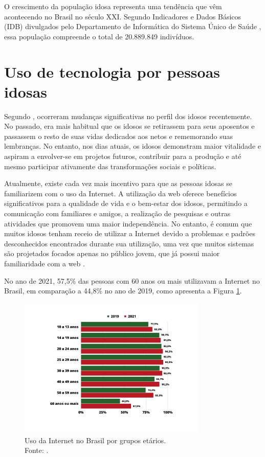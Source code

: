 O crescimento da população idosa representa uma tendência que vêm acontecendo no Brasil no século XXI. Segundo Indicadores e Dados Básicos (IDB) divulgados pelo Departamento de Informática do Sistema Único de Saúde \cite{DATASUS2012}, essa população compreende o total de 20.889.849 indivíduos.

\section{Uso de tecnologia por pessoas idosas}

Segundo , ocorreram mudanças significativas no perfil dos idosos recentemente. No passado, era mais habitual que os idosos se retirassem para seus aposentos e passassem o resto de suas vidas dedicados aos netos e rememorando suas lembranças. No entanto, nos dias atuais, os idosos demonstram maior vitalidade e aspiram a envolver-se em projetos futuros, contribuir para a produção e até mesmo participar ativamente das transformações sociais e políticas. 

Atualmente, existe cada vez mais incentivo para que as pessoas idosas se familiarizem com o uso da Internet. A utilização da web oferece benefícios significativos para a qualidade de vida e o bem-estar dos idosos, permitindo a comunicação com familiares e amigos, a realização de pesquisas e outras atividades que promovem uma maior independência. No entanto, é comum que muitos idosos tenham receio de utilizar a Internet devido a problemas e padrões desconhecidos encontrados durante sua utilização, uma vez que muitos sistemas são projetados focados apenas no público jovem, que já possui maior familiaridade com a web \cite{rodrigues2018support}.

No ano de 2021, 57,5\% das pessoas com 60 anos ou mais utilizavam a Internet no Brasil, em comparação a 44,8\% no ano de 2019, como apresenta a Figura \ref{fig:uso_Internet}.

\begin{figure}[H]
    \centering
    \includegraphics[width=0.8\textwidth]{figuras/uso_da_Internet_grupos_etarios.pdf}
    \vspace{-40pt}
    \caption{Uso da Internet no Brasil por grupos etários. \\
    Fonte: .}
    \label{fig:uso_Internet}
\end{figure}


